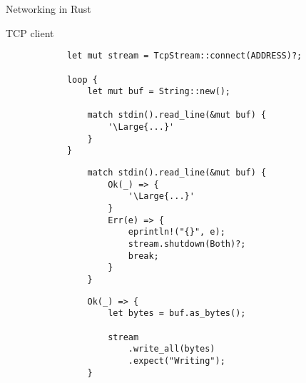 \begin{frame}[fragile]{Networking in Rust}

    \begin{block}{TCP client}
        \begin{overprint}
            \begin{verbatim}
            let mut stream = TcpStream::connect(ADDRESS)?;

            loop {
                let mut buf = String::new();
            
                match stdin().read_line(&mut buf) {
                    '\Large{...}'
                }
            }
            \end{verbatim}

            \begin{verbatim}
                match stdin().read_line(&mut buf) {
                    Ok(_) => {
                        '\Large{...}'
                    }
                    Err(e) => {
                        eprintln!("{}", e);
                        stream.shutdown(Both)?;
                        break;
                    }
                }
            \end{verbatim}

            \begin{verbatim}
                Ok(_) => {
                    let bytes = buf.as_bytes();
        
                    stream
                        .write_all(bytes)
                        .expect("Writing");
                }
            \end{verbatim}
        \end{overprint}
    \end{block}
\end{frame}
